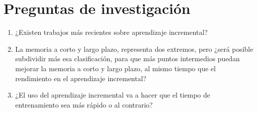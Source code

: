 \chapter{Preguntas de investigación}

\begin{enumerate}
  \item ¿Existen trabajos más recientes sobre aprendizaje incremental?
  \item La memoria a corto y largo plazo, representa dos extremos, pero ¿será posible subdividir más esa clasificación, para que más puntos intermedios puedan mejorar la memoria a corto y largo plazo, al mismo tiempo que el rendimiento en el aprendizaje incremental?
  \item ¿El uso del aprendizaje incremental va a hacer que el tiempo de entrenamiento sea  m\'as r\'apido o al contrario?
\end{enumerate}